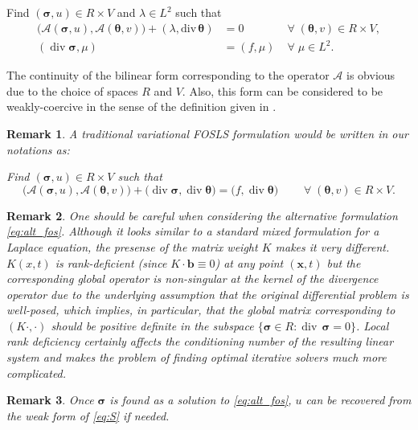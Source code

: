 \documentclass[a4paper,12pt]{amsart}
\numberwithin{equation}{section}
\newtheorem{remark}{Remark}[section]
\renewcommand{\div}{\operatorname{div}}
\def\bb{{\mathbf b}}
\newcommand{\A}{{\mathcal A}}
\def\XVec#1{{\mathbf #1}}
\def\Xx{\XVec{x}}
\def\btheta{{\boldsymbol \theta}}
\def\bsigma{{\boldsymbol \sigma}}
\newcommand{\om}{\Omega}
\begin{document}
Find $(\bsigma, u) \in R\times V$ and $\lambda \in L^2$ such that 
\begin{equation}
\begin{array}{lll}
\big(\A(\bsigma, u), \A(\btheta, v) \big) + (\lambda, \mathrm{div}\,  \btheta) & = 0  & \;\forall\; (\btheta, v) \in R\times V,     \\
( \div  \bsigma,\mu )  &= (f, \mu) &  \;\forall\;  \mu\in L^2.
\end{array}
\label{eq:kkt_system}
\end{equation} 

The continuity of the bilinear form corresponding to the operator $\A$ is obvious due to the choice of spaces $R$ and $V$. Also, this form can be considered to be weakly-coercive in the sense of the definition given in \cite{AdlerVassilevski}.

\begin{remark}
A traditional variational FOSLS formulation would be written in our notations as:

Find $(\bsigma, u) \in R\times V$ such that 
\[
\big(\A(\bsigma, u ), \A(\btheta, v) \big) + \big( \div \bsigma, \div \btheta \big) = \big(f, \div \btheta\big) \qquad \;\forall\; (\btheta, v) \in R\times V.
\]
\end{remark}

\begin{remark}
One should be careful when considering the alternative formulation \eqref{eq:alt_fos}. Although it looks similar to a standard mixed formulation for a Laplace equation, the presense of the matrix weight $K$ makes it very different. $K(x,t)$ is rank-deficient (since $K \cdot \bb \equiv 0$) at any point $(\Xx,t)$ but the corresponding global operator is non-singular at the kernel of the divergence operator due to the underlying assumption that the original differential problem is well-posed, which implies, in particular, that the global matrix corresponding to $(K\cdot,\cdot)$ should  be positive definite in the subspace $\{\bsigma \in R : \div \, \bsigma = 0\}$. Local rank deficiency certainly affects the conditioning number of the resulting linear system and makes the problem of finding optimal iterative solvers much more complicated.
\end{remark}

\begin{remark}
Once $\bsigma$ is found as a solution to \eqref{eq:alt_fos}, $u$ can be recovered from the weak form of \eqref{eq:S} if needed.
\end{remark}
\end{document}
